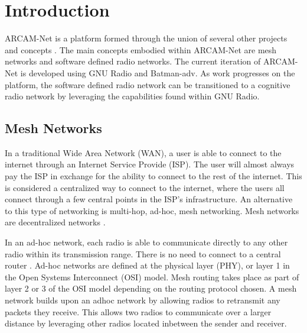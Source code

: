 
\chapter{Introduction} %

\label{Chapter1} %

ARCAM-Net is a platform formed through the union of several other projects and concepts \cite{selfpaper}. The main concepts embodied within ARCAM-Net are mesh networks and software defined radio networks. The current iteration of ARCAM-Net is developed using GNU Radio and Batman-adv. As work progresses on the platform, the software defined radio network can be transitioned to a cognitive radio network by leveraging the capabilities found within GNU Radio. 


\newcommand{\keyword}[1]{\textbf{#1}}
\newcommand{\tabhead}[1]{\textbf{#1}}
\newcommand{\code}[1]{\texttt{#1}}
\newcommand{\file}[1]{\texttt{\bfseries#1}}
\newcommand{\option}[1]{\texttt{\itshape#1}}


\section{Mesh Networks}

In a traditional Wide Area Network (WAN), a user is able to connect to the internet through an Internet Service Provide (ISP). The user will almost always pay the ISP in exchange for the ability to connect to the rest of the internet. This is considered a centralized way to connect to the internet, where the users all connect through a few central points in the ISP's infrastructure. An alternative to this type of networking is multi-hop, ad-hoc, mesh networking. Mesh networks are decentralized networks \cite{4796928}. 

In an ad-hoc network, each radio is able to communicate directly to any other radio within its transmission range. There is no need to connect to a central router \cite{4796928}. Ad-hoc networks are defined at the physical layer (PHY), or layer 1 in the Open Systems Interconnect (OSI) model. Mesh routing takes place as part of layer 2 or 3 of the OSI model depending on the routing protocol chosen. A mesh network builds upon an adhoc network by allowing radios to retransmit any packets they receive. This allows two radios to communicate over a larger distance by leveraging other radios located inbetween the sender and receiver\cite{0033}. 

